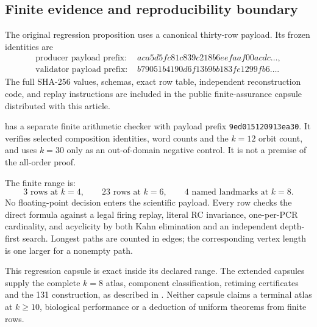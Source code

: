 \subsection{Finite evidence and reproducibility boundary}
\label{app:finite-evidence}

The original regression proposition uses a canonical thirty-row payload.  Its frozen
identities are
\begin{align*}
  \text{producer payload prefix: }&aca5d5fc81c839c218b6eefaaf00acdc\ldots,\\
  \text{validator payload prefix: }&b79051b4190d6f13b9bb183fe1299fb6\ldots.
\end{align*}
The full SHA-256 values, schemas, exact row table, independent reconstruction
code, and replay instructions are included in the public finite-assurance
capsule distributed with this article.

 has a separate finite arithmetic checker with payload prefix
\texttt{9ed015120913ea30}.  It verifies selected composition identities, word
counts and the $k=12$ orbit count, and uses $k=30$ only as an out-of-domain
negative control.  It is not a premise of the all-order proof.

The finite range is:
\[
  3\text{ rows at }k=4,
  \qquad 23\text{ rows at }k=6,
  \qquad 4\text{ named landmarks at }k=8.
\]
No floating-point decision enters the scientific payload.  Every row checks
the direct formula against a legal firing replay, literal RC invariance,
one-per-PCR cardinality, and acyclicity by both Kahn elimination and an
independent depth-first search.  Longest paths are counted in edges; the
corresponding vertex length is one larger for a nonempty path.

This regression capsule is exact inside its declared range. The extended
capsules supply the complete $k=8$ atlas, component classification, retiming
certificates and the 131 construction, as described in
. Neither capsule claims a terminal atlas at
$k\ge10$, biological performance or a deduction of uniform theorems
from finite rows.
